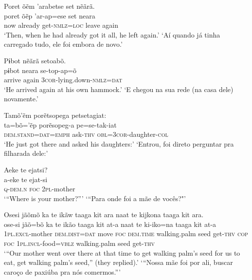 \documentclass[output=paper,
modfonts,nonflat
]{langsci/langscibook}
\begin{document}
\ea Poret õẽm 'arabetse set nẽãrã.\\[.3em]
\gll poret õẽp 'ar-ap=ese set neara\\
     now already get-\textsc{nmlz}=\textsc{loc} leave again\\
\glt ‘Then, when he had already got it all, he left again.’
\glt ‘Aí quando já tinha carregado tudo, ele foi embora de novo.'
\z 

\ea Pɨbot nẽãrã setoabõ.{\footnotemark}\\[.3em]
\gll pɨbot neara se-top-ap=õ\\
     arrive again \textsc{3cor}-lying.down-\textsc{nmlz}=\textsc{dat}\\
\glt ‘He arrived again at his own hammock.’
\glt ‘E chegou na sua rede (na casa dele) novamente.'	
\z 

\ea Tamõ'ẽm porẽtsopega{\footnotemark} petsetagiat:\\[.3em]
\gll ta=bõ='ẽp porẽsopeg-a pe=se-tak-iat\\
     \textsc{dem.stand}=\textsc{dat}=\textsc{emph} ask-\textsc{thv} \textsc{obl}=\textsc{3cor}-daughter-\textsc{col}\\
\glt ‘He just got there and asked his daughters:’
\glt ‘Entrou, foi direto perguntar pra filharada dele:'
\z

\newpage 
\ea Aeke te ejatsi?\\[.3em]
\gll a-eke te ejat-si\\
     \textsc{q}-\textsc{dem.n} \textsc{foc} \textsc{2pl}-mother\\
\glt ‘“Where is your mother?”’
\glt ‘“Para onde foi a mãe de vocês?"'
\z 


\ea Osesi jãõmõ ka te ikãw taaga kit ara naat te kijkona taaga kit ara.\\[.3em]
\gll ose-si jãõ=bõ ka te ikão taaga kit at-a naat te ki-iko=na taaga kit at-a\\
     \textsc{1pl.excl}-mother \textsc{dem.dist}=\textsc{dat} move \textsc{foc} \textsc{dem.time} walking.palm seed get-\textsc{thv} \textsc{cop} \textsc{foc} \textsc{1pl.incl}-food=\textsc{vblz} walking.palm seed get-\textsc{thv}\\
\glt  ‘“Our mother went over there at that time to get walking palm's seed for us to eat, get walking palm's seed,” (they replied).’{\footnotemark}
\glt ‘“Nossa mãe foi por ali, buscar caroço de paxiúba pra nós comermos.”'
\z
\end{document}
